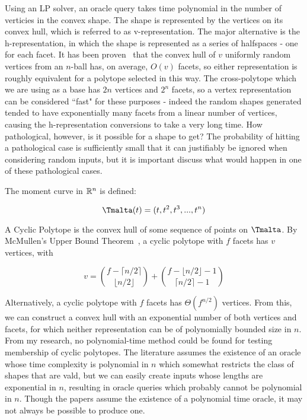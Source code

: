 Using an LP solver, an oracle query takes time polynomial in the number of verticies in the convex shape. The shape is represented by the vertices on its convex hull, which is referred to as v-representation. The major alternative is the h-representation, in which the shape is represented as a series of halfspaces - one for each facet. It has been proven~\cite{Buchta85} that the convex hull of $v$ uniformly random vertices from an $n$-ball has, on average, $O(v)$ facets, so either representation is roughly equivalent for a polytope selected in this way. The cross-polytope which we are using as a base has $2n$ vertices and $2^n$ facets, so a vertex representation can be considered ``fast" for these purposes - indeed the random shapes generated tended to have exponentially many facets from a linear number of vertices, causing the h-representation conversions to take a very long time. How pathological, however, is it possible for a shape to get? The probability of hitting a pathological case is sufficiently small that it can justifiably be ignored when considering random inputs, but it is important discuss what would happen in one of these pathological cases.

The moment curve in $\mathbb{R}^n$ is defined:

$$
\tengm(t) = (t, t^2, t^3, ..., t^n)
$$

A Cyclic Polytope is the convex hull of some sequence of points on $\tengm$. By McMullen's Upper Bound Theorem~\cite{McMullen70}, a cyclic polytope with $f$ facets has $v$ vertices, with

$$
v = {{f-\lceil n/2 \rceil}\choose{\lfloor {n/2} \rfloor}} + {{f-\lfloor n/2 \rfloor -1} \choose {\lceil {n/2} \rceil - 1}}
$$

Alternatively, a cyclic polytope with $f$ facets has $\Theta(f^{n/2})$ vertices. From this, we can construct a convex hull with an exponential number of both vertices and facets, for which neither representation can be of polynomially bounded size in $n$. From my research, no polynomial-time method could be found for testing membership of cyclic polytopes. The literature assumes the existence of an oracle whose time complexity is polynomial in $n$ which somewhat restricts the class of shapes that are vald, but we can easily create inputs whose lengths are exponential in $n$, resulting in oracle queries which probably cannot be polynomial in $n$. Though the papers assume the existence of a polynomial time oracle, it may not always be possible to produce one.